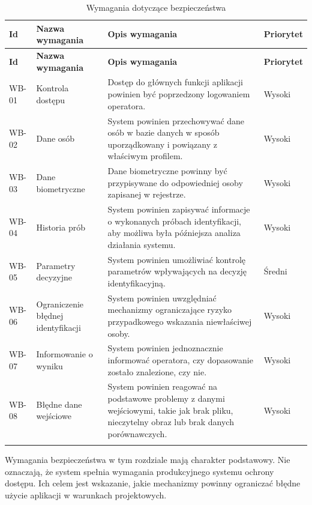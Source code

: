 \begin{xltabular}{\textwidth}{|
    >{\RaggedRight\arraybackslash}p{1.5cm}|
    >{\RaggedRight\arraybackslash}p{3.2cm}|
    >{\RaggedRight\arraybackslash}X|
    >{\RaggedRight\arraybackslash}p{1.8cm}|}

    \hline
    \textbf{Id} & \textbf{Nazwa wymagania} & \textbf{Opis wymagania} & \textbf{Priorytet} \\
    \hline
    \endfirsthead

    \hline
    \textbf{Id} & \textbf{Nazwa wymagania} & \textbf{Opis wymagania} & \textbf{Priorytet} \\
    \hline
    \endhead

    WB-01 & Kontrola dostępu & Dostęp do głównych funkcji aplikacji powinien być poprzedzony logowaniem operatora. & Wysoki \\
    \hline
    WB-02 & Dane osób & System powinien przechowywać dane osób w bazie danych w sposób uporządkowany i powiązany z właściwym profilem. & Wysoki \\
    \hline
    WB-03 & Dane biometryczne & Dane biometryczne powinny być przypisywane do odpowiedniej osoby zapisanej w rejestrze. & Wysoki \\
    \hline
    WB-04 & Historia prób & System powinien zapisywać informacje o wykonanych próbach identyfikacji, aby możliwa była późniejsza analiza działania systemu. & Wysoki \\
    \hline
    WB-05 & Parametry decyzyjne & System powinien umożliwiać kontrolę parametrów wpływających na decyzję identyfikacyjną. & Średni \\
    \hline
    WB-06 & Ograniczenie błędnej identyfikacji & System powinien uwzględniać mechanizmy ograniczające ryzyko przypadkowego wskazania niewłaściwej osoby. & Wysoki \\
    \hline
    WB-07 & Informowanie o wyniku & System powinien jednoznacznie informować operatora, czy dopasowanie zostało znalezione, czy nie. & Wysoki \\
    \hline
    WB-08 & Błędne dane wejściowe & System powinien reagować na podstawowe problemy z danymi wejściowymi, takie jak brak pliku, nieczytelny obraz lub brak danych porównawczych. & Wysoki \\
    \hline

    \caption{Wymagania dotyczące bezpieczeństwa}
    \label{tab:wymagania-bezpieczenstwa}
\end{xltabular}

Wymagania bezpieczeństwa w tym rozdziale mają charakter podstawowy. Nie oznaczają, że system spełnia wymagania produkcyjnego systemu ochrony dostępu. Ich celem jest wskazanie, jakie mechanizmy powinny ograniczać błędne użycie aplikacji w warunkach projektowych.

